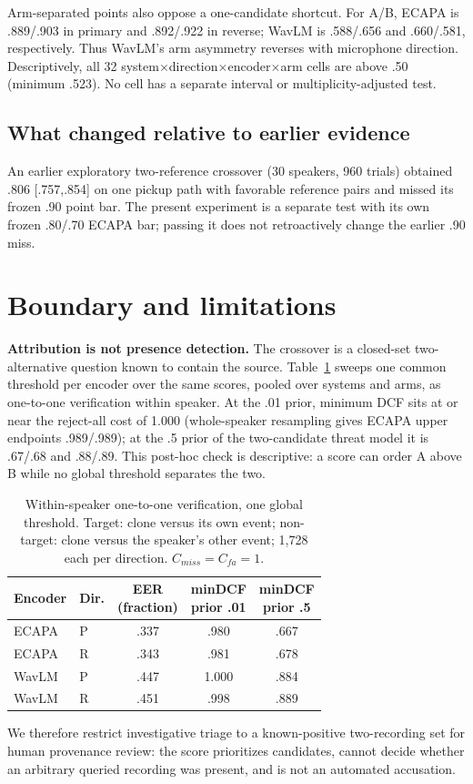\documentclass[10pt,twocolumn,letterpaper]{article}
\begin{document}
Arm-separated points also oppose a one-candidate shortcut. For A/B, ECAPA is
.889/.903 in primary and .892/.922 in reverse; WavLM is .588/.656 and
.660/.581, respectively. Thus WavLM's arm asymmetry reverses with microphone
direction. Descriptively, all 32
system$\times$direction$\times$encoder$\times$arm cells are above .50 (minimum .523).
No cell has a separate interval or multiplicity-adjusted test.

\subsection{What changed relative to earlier evidence}
An earlier exploratory two-reference crossover (30 speakers, 960 trials)
obtained .806 [.757,.854] on one pickup path with favorable reference pairs and
missed its frozen .90 point bar. The present experiment is a separate test with
its own frozen .80/.70 ECAPA bar; passing it does not retroactively change the
earlier .90 miss.

\section{Boundary and limitations}
\textbf{Attribution is not presence detection.} The crossover is a closed-set
two-alternative question known to contain the source. Table~\ref{tab:presence}
sweeps one common threshold per encoder over the same scores, pooled over
systems and arms, as one-to-one verification within speaker. At the .01 prior,
minimum DCF sits at or near the reject-all cost of 1.000 (whole-speaker
resampling gives ECAPA upper endpoints .989/.989); at the .5 prior of the
two-candidate threat model it is .67/.68 and .88/.89. This post-hoc check is
descriptive: a score can order A above B while no global threshold separates
the two.

\begin{table}[bp]
\centering
\caption{Within-speaker one-to-one verification, one global threshold. Target:
clone versus its own event; non-target: clone versus the speaker's other event;
1,728 each per direction. $C_{miss}=C_{fa}=1$.}
\label{tab:presence}
{\small
\begin{tabular}{llccc}
\toprule
Encoder & Dir. & \shortstack{EER\\(fraction)} & \shortstack{minDCF\\prior .01} & \shortstack{minDCF\\prior .5} \\
\midrule
ECAPA & P & .337 & .980 & .667 \\
ECAPA & R & .343 & .981 & .678 \\
WavLM & P & .447 & 1.000 & .884 \\
WavLM & R & .451 & .998 & .889 \\
\bottomrule
\end{tabular}}
\end{table}
We therefore restrict investigative triage to a known-positive two-recording set
for human provenance review: the score prioritizes candidates, cannot decide
whether an arbitrary queried recording was present, and is not an automated
accusation.
\end{document}
